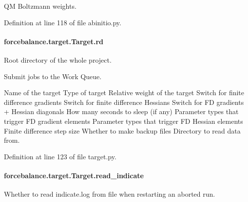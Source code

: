 Q\-M Boltzmann weights. 



Definition at line 118 of file abinitio.\-py.

\hypertarget{classforcebalance_1_1target_1_1Target_a4edb69fbde792e9f2f27e54b7c978c8e}{
\paragraph[{rd}]{\setlength{\rightskip}{0pt plus 5cm}forcebalance.\-target.\-Target.\-rd\hspace{0.3cm}{\ttfamily [inherited]}}}\label{classforcebalance_1_1target_1_1Target_a4edb69fbde792e9f2f27e54b7c978c8e}


Root directory of the whole project. 

Submit jobs to the Work Queue.

Name of the target Type of target Relative weight of the target Switch for finite difference gradients Switch for finite difference Hessians Switch for F\-D gradients + Hessian diagonals How many seconds to sleep (if any) Parameter types that trigger F\-D gradient elements Parameter types that trigger F\-D Hessian elements Finite difference step size Whether to make backup files Directory to read data from.

Definition at line 123 of file target.\-py.

\hypertarget{classforcebalance_1_1target_1_1Target_aa8af57d5be669c4bb1c0cfd4b7a9220e}{
\paragraph[{read\-\_\-indicate}]{\setlength{\rightskip}{0pt plus 5cm}forcebalance.\-target.\-Target.\-read\-\_\-indicate\hspace{0.3cm}{\ttfamily [inherited]}}}\label{classforcebalance_1_1target_1_1Target_aa8af57d5be669c4bb1c0cfd4b7a9220e}


Whether to read indicate.\-log from file when restarting an aborted run. 



